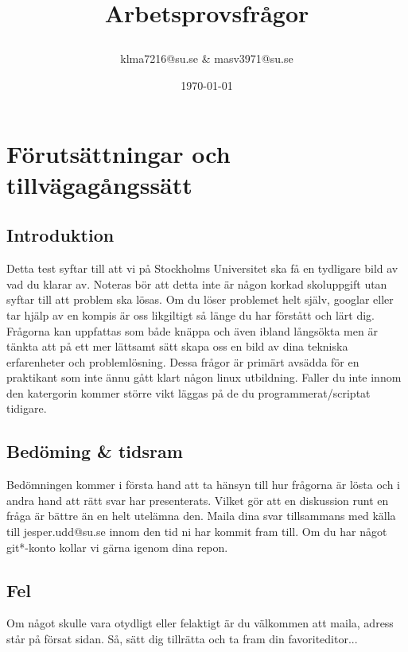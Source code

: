 \documentclass[a4paper]{report}
\title{Arbetsprovsfrågor\date{\today}}
\author{klma7216@su.se \& masv3971@su.se}
\begin{document}
    \maketitle
    \newpage

\section{Förutsättningar och tillvägagångssätt}
\subsection{Introduktion}
Detta test syftar till att vi på Stockholms Universitet ska få en tydligare bild av vad du klarar av. Noteras bör att detta inte är någon korkad skoluppgift utan syftar till att problem ska lösas. Om du löser problemet helt själv, googlar eller tar hjälp av en kompis är oss likgiltigt så länge du har förstått och lärt dig. Frågorna kan uppfattas som både knäppa och även ibland långsökta men är tänkta att på ett mer lättsamt sätt skapa oss en bild av dina tekniska erfarenheter och problemlösning.
\newline
Dessa frågor är primärt avsädda för en praktikant som inte ännu gått klart någon linux utbildning. Faller du inte innom den katergorin kommer större vikt läggas på de du programmerat/scriptat tidigare.
\newline


\subsection{Bedöming \& tidsram}
Bedömningen kommer i första hand att ta hänsyn till hur frågorna är lösta och i andra hand att rätt svar har presenterats. Vilket gör att en diskussion runt en fråga är bättre än en helt utelämna den.
\newline
Maila dina svar tillsammans med källa till jesper.udd@su.se innom den tid ni har kommit fram till. Om du har något git*-konto kollar vi gärna igenom dina repon.
\newline

\subsection{Fel}
Om något skulle vara otydligt eller felaktigt är du välkommen att maila, adress står på försat sidan.
\newline
\newline
Så, sätt dig tillrätta och ta fram din favoriteditor...
    \newpage
\end{document}
